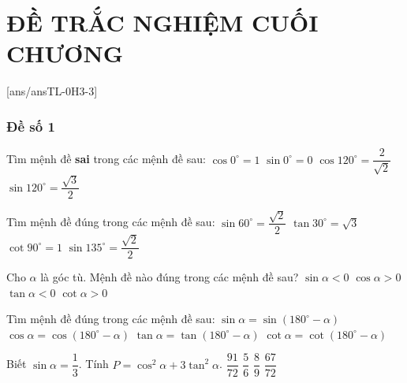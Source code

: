 \section*{ĐỀ TRẮC NGHIỆM CUỐI CHƯƠNG}
[ans/ansTL-0H3-3]
\setcounter{ex}{0}
\subsubsection{Đề số 1}

\begin{ex}%
	Tìm mệnh đề \textbf{sai} trong các mệnh đề sau:
	\choice
	{$\cos 0^\circ=1$}
	{$\sin 0^\circ=0$}
	{\True $\cos 120^\circ=\dfrac{2}{\sqrt{2}}$}
	{$\sin 120^\circ=\dfrac{\sqrt{3}}{2}$}
\end{ex}

\begin{ex}%
	Tìm mệnh đề đúng trong các mệnh đề sau:
	\choice
	{$\sin 60^\circ=\dfrac{\sqrt{2}}{2}$}
	{$\tan 30^\circ=\sqrt{3}$}
	{$\cot 90^\circ=1$}
	{\True $\sin 135^\circ=\dfrac{\sqrt{2}}{2}$}
\end{ex}

\begin{ex}%
	Cho $\alpha$ là góc tù. Mệnh đề nào đúng trong các mệnh đề sau?
	\choice
	{$\sin\alpha<0$}
	{$\cos\alpha>0$}
	{\True $\tan\alpha<0$}
	{$\cot\alpha>0$}
\end{ex}

\begin{ex}%
	Tìm mệnh đề đúng trong các mệnh đề sau:
	\choice
	{\True $\sin\alpha=\sin(180^\circ-\alpha)$}
	{$\cos\alpha=\cos(180^\circ-\alpha)$}
	{$\tan\alpha=\tan(180^\circ-\alpha)$}
	{$\cot\alpha=\cot(180^\circ-\alpha)$}
\end{ex}

\begin{ex}%
	Biết $\sin \alpha = \dfrac{1}{3}$. Tính $P= \cos^2 \alpha + 3\tan^2 \alpha$.
	\choice
	{\True $\dfrac{91}{72}$}
	{$\dfrac{5}{6}$}
	{$\dfrac{8}{9}$}
	{$\dfrac{67}{72}$}
\end{ex}

